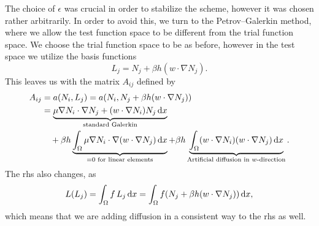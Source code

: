 The choice of $\epsilon$ was crucial in order to stabilize the scheme, however it was chosen rather arbitrarily.
In order to avoid this, we turn to the Petrov--Galerkin method, where we allow the test function space to be different from the trial function space. %
We choose the trial function space to be as before, however in the test space we utilize the basis functions
\begin{equation}
    L_j = N_j + \beta h (w \cdot \nabla N_j).
\end{equation}
This leaves us with the matrix $A_{ij}$ defined by
\begin{align*}
    A_{ij} &= a(N_i, L_j) = a(N_i, N_j + \beta h (w \cdot \nabla N_j)) \\
    &= \underbrace{
        \mu \nabla N_i \cdot \nabla N_j + (w \cdot \nabla N_i) N_j \mathop{}\!\mathrm{d} x
    }_{\text{standard Galerkin}} \\
    &\quad + \beta h \underbrace{
        \int_\Omega \mu \nabla N_i \cdot \nabla(w \cdot \nabla N_j) \mathop{}\!\mathrm{d} x
    }_{ = 0 \text{ for linear elements}}
    + \beta h \underbrace{
        \int_{\Omega} (w \cdot \nabla N_i) (w \cdot \nabla N_j) \mathop{}\!\mathrm{d} x
    }_{\text{Artificial diffusion in $w$-direction}}.
\end{align*}
The rhs also changes, as
\begin{equation}
    L(L_j) = \int_\Omega f\, L_j \mathop{}\!\mathrm{d} x
    = \int_\Omega f( N_j + \beta h (w \cdot \nabla N_j) ) \mathop{}\!\mathrm{d} x,
\end{equation}
which means that we are adding diffusion in a consistent way to the rhs as well.